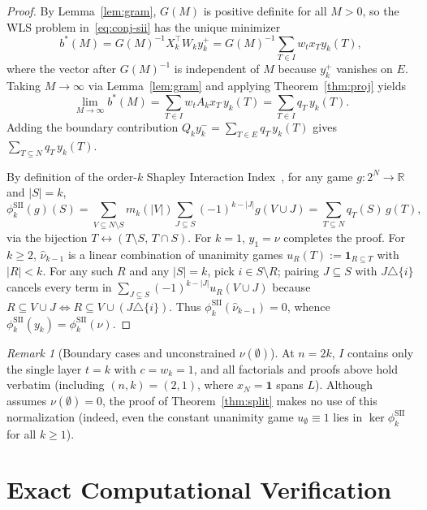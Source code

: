 \documentclass[11pt]{article}
\theoremstyle{plain}
\theoremstyle{definition}
\theoremstyle{remark}
\newtheorem{remark}{Remark}
\begin{document}
\begin{proof}
By Lemma~\ref{lem:gram}, $G(M)$ is positive definite for all $M > 0$, so the WLS problem in~\eqref{eq:conj-sii} has the unique minimizer
\[
b^*(M) = G(M)^{-1} X_k^\top W_k y_k^+ = G(M)^{-1} \sum_{T \in I} w_t x_T y_k(T),
\]
where the vector after $G(M)^{-1}$ is independent of $M$ because $y_k^+$ vanishes on $E$. Taking $M \to \infty$ via Lemma~\ref{lem:gram} and applying Theorem~\ref{thm:proj} yields
\[
\lim_{M \to \infty} b^*(M) = \sum_{T \in I} w_t A_k x_T\, y_k(T) = \sum_{T \in I} q_T\, y_k(T).
\]
Adding the boundary contribution $Q_k y_k^- = \sum_{T \in E} q_T\, y_k(T)$ gives $\sum_{T \subseteq N} q_T\, y_k(T)$.

By definition of the order-$k$ Shapley Interaction Index~\cite{Grabisch1999}, for any game $g : 2^N \to \mathbb{R}$ and $|S| = k$,
\[
\phi_k^{\mathrm{SII}}(g)(S) = \sum_{V \subseteq N \setminus S} m_k(|V|) \sum_{J \subseteq S} (-1)^{k - |J|} g(V \cup J) = \sum_{T \subseteq N} q_T(S)\, g(T),
\]
via the bijection $T \leftrightarrow (T \setminus S,\, T \cap S)$. For $k = 1$, $y_1 = \nu$ completes the proof. For $k \ge 2$, $\hat{\nu}_{k-1}$ is a linear combination of unanimity games $u_R(T) := \mathbf{1}_{R \subseteq T}$ with $|R| < k$. For any such $R$ and any $|S| = k$, pick $i \in S \setminus R$; pairing $J \subseteq S$ with $J \triangle \{i\}$ cancels every term in $\sum_{J \subseteq S} (-1)^{k - |J|} u_R(V \cup J)$ because $R \subseteq V \cup J \iff R \subseteq V \cup (J \triangle \{i\})$. Thus $\phi_k^{\mathrm{SII}}(\hat{\nu}_{k-1}) = 0$, whence $\phi_k^{\mathrm{SII}}(y_k) = \phi_k^{\mathrm{SII}}(\nu)$.
\end{proof}

\begin{remark}[Boundary cases and unconstrained $\nu(\emptyset)$]
At $n = 2k$, $I$ contains only the single layer $t = k$ with $c = w_k = 1$, and all factorials and proofs above hold verbatim (including $(n, k) = (2, 1)$, where $x_N = \mathbf{1}$ spans $L$). Although~\cite{Fumagalli2024} assumes $\nu(\emptyset) = 0$, the proof of Theorem~\ref{thm:split} makes no use of this normalization (indeed, even the constant unanimity game $u_\emptyset \equiv 1$ lies in $\ker \phi_k^{\mathrm{SII}}$ for all $k \ge 1$).
\end{remark}

\section{Exact Computational Verification}
\end{document}
